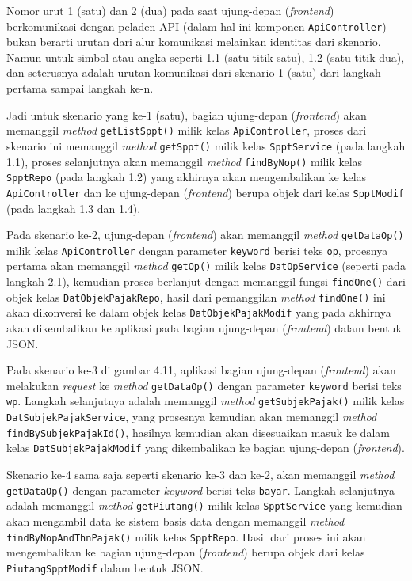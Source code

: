 Nomor urut 1 (satu) dan 2 (dua) pada saat ujung-depan (\textit{frontend}) berkomunikasi dengan peladen API (dalam hal ini komponen \texttt{ApiController}) bukan berarti urutan dari alur komunikasi melainkan identitas dari skenario. Namun untuk simbol atau angka seperti 1.1 (satu titik satu), 1.2 (satu titik dua), dan seterusnya adalah urutan komunikasi dari skenario 1 (satu) dari langkah pertama sampai langkah ke-n.

Jadi untuk skenario yang ke-1 (satu), bagian ujung-depan (\textit{frontend}) akan memanggil \textit{method} \texttt{getListSppt()} milik kelas \texttt{ApiController}, proses dari skenario ini memanggil \textit{method} \texttt{getSppt()} milik kelas \texttt{SpptService} (pada langkah 1.1), proses selanjutnya akan memanggil \textit{method} \texttt{findByNop()} milik kelas \texttt{SpptRepo} (pada langkah 1.2) yang akhirnya akan mengembalikan ke kelas \texttt{ApiController} dan ke ujung-depan (\textit{frontend}) berupa objek dari kelas \texttt{SpptModif} (pada langkah 1.3 dan 1.4).

Pada skenario ke-2, ujung-depan (\textit{frontend}) akan memanggil \textit{method} \texttt{getDataOp()} milik kelas \texttt{ApiController} dengan parameter \texttt{keyword} berisi teks \texttt{op}, proesnya pertama akan memanggil \textit{method} \texttt{getOp()} milik kelas \texttt{DatOpService} (seperti pada langkah 2.1), kemudian proses berlanjut dengan memanggil fungsi \texttt{findOne()} dari objek kelas \texttt{DatObjekPajakRepo}, hasil dari pemanggilan \textit{method} \texttt{findOne()} ini akan dikonversi ke dalam objek kelas \texttt{DatObjekPajakModif} yang pada akhirnya akan dikembalikan ke aplikasi pada bagian ujung-depan (\textit{frontend}) dalam bentuk JSON.

Pada skenario ke-3 di gambar 4.11, aplikasi bagian ujung-depan (\textit{frontend}) akan melakukan \textit{request} ke \textit{method} \texttt{getDataOp()} dengan parameter \texttt{keyword} berisi teks \texttt{wp}. Langkah selanjutnya adalah memanggil \textit{method} \texttt{getSubjekPajak()} milik kelas \texttt{DatSubjekPajakService}, yang prosesnya kemudian akan memanggil \textit{method} \texttt{findBySubjekPajakId()}, hasilnya kemudian akan disesuaikan masuk ke dalam kelas \texttt{DatSubjekPajakModif} yang dikembalikan ke bagian ujung-depan (\textit{frontend}).

Skenario ke-4 sama saja seperti skenario ke-3 dan ke-2, akan memanggil \textit{method} \texttt{getDataOp()} dengan parameter \textit{keyword} berisi teks \texttt{bayar}. Langkah selanjutnya adalah memanggil \textit{method} \texttt{getPiutang()} milik kelas \texttt{SpptService} yang kemudian akan mengambil data ke sistem basis data dengan memanggil \textit{method} \texttt{findByNopAndThnPajak()} milik kelas \texttt{SpptRepo}. Hasil dari proses ini akan mengembalikan ke bagian ujung-depan (\textit{frontend}) berupa objek dari kelas \texttt{PiutangSpptModif} dalam bentuk JSON.


